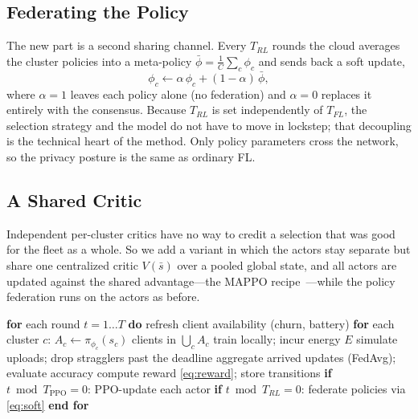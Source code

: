 \documentclass[conference]{IEEEtran}
\begin{document}
\subsection{Federating the Policy}
The new part is a second sharing channel. Every $T_{RL}$ rounds the cloud averages
the cluster policies into a meta-policy $\bar{\phi}=\frac{1}{C}\sum_c\phi_c$ and
sends back a soft update,
\begin{equation}
\phi_c \leftarrow \alpha\,\phi_c + (1-\alpha)\,\bar{\phi},
\label{eq:soft}
\end{equation}
where $\alpha\!=\!1$ leaves each policy alone (no federation) and $\alpha\!=\!0$
replaces it entirely with the consensus. Because $T_{RL}$ is set independently of
$T_{FL}$, the selection strategy and the model do not have to move in lockstep;
that decoupling is the technical heart of the method. Only policy parameters cross
the network, so the privacy posture is the same as ordinary FL.

\subsection{A Shared Critic}
Independent per-cluster critics have no way to credit a selection that was good for
the fleet as a whole. So we add a variant in which the actors stay separate but
share one centralized critic $V(\bar{s})$ over a pooled global state, and all
actors are updated against the shared advantage---the MAPPO
recipe~\cite{yu2022}---while the policy federation runs on the actors as before.

\begin{algorithm}[t]
\caption{FedRL-CS round (federated multi-agent variant)}
\label{alg:main}
\begin{algorithmic}[1]
\STATE \textbf{for} each round $t=1\ldots T$ \textbf{do}
\STATE \quad refresh client availability (churn, battery)
\STATE \quad \textbf{for} each cluster $c$: $A_c \leftarrow \pi_{\phi_c}(s_c)$
\STATE \quad clients in $\bigcup_c A_c$ train locally; incur energy $E$
\STATE \quad simulate uploads; drop stragglers past the deadline
\STATE \quad aggregate arrived updates (FedAvg); evaluate accuracy
\STATE \quad compute reward \eqref{eq:reward}; store transitions
\STATE \quad \textbf{if} $t \bmod T_{\text{PPO}}=0$: PPO-update each actor
\STATE \quad \textbf{if} $t \bmod T_{RL}=0$: federate policies via \eqref{eq:soft}
\STATE \textbf{end for}
\end{algorithmic}
\end{algorithm}
\end{document}
